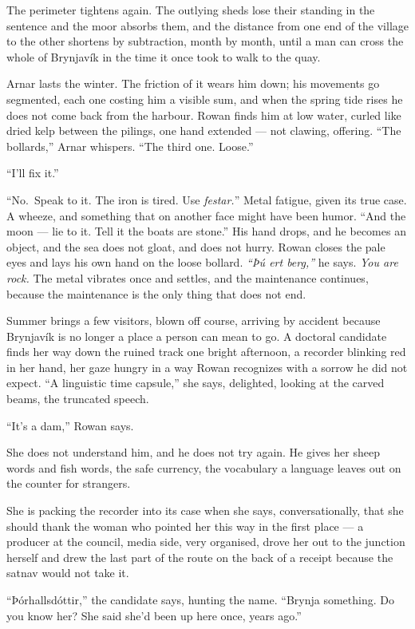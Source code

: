 \documentclass[11pt,oneside]{book}
\begin{document}
The perimeter tightens again. The outlying sheds lose their standing in
the sentence and the moor absorbs them, and the distance from one end of
the village to the other shortens by subtraction, month by month, until
a man can cross the whole of Brynjavík in the time it once took to walk
to the quay.

Arnar lasts the winter. The friction of it wears him down; his movements
go segmented, each one costing him a visible sum, and when the spring
tide rises he does not come back from the harbour. Rowan finds him at
low water, curled like dried kelp between the pilings, one hand extended
--- not clawing, offering. ``The bollards,'' Arnar whispers. ``The third
one. Loose.''

``I'll fix it.''

``No.~Speak to it. The iron is tired. Use \emph{festar.}'' Metal
fatigue, given its true case. A wheeze, and something that on another
face might have been humor. ``And the moon --- lie to it. Tell it the
boats are stone.'' His hand drops, and he becomes an object, and the sea
does not gloat, and does not hurry. Rowan closes the pale eyes and lays
his own hand on the loose bollard. \emph{``Þú ert berg,''} he says.
\emph{You are rock.} The metal vibrates once and settles, and the
maintenance continues, because the maintenance is the only thing that
does not end.

Summer brings a few visitors, blown off course, arriving by accident
because Brynjavík is no longer a place a person can mean to go. A
doctoral candidate finds her way down the ruined track one bright
afternoon, a recorder blinking red in her hand, her gaze hungry in a way
Rowan recognizes with a sorrow he did not expect. ``A linguistic time
capsule,'' she says, delighted, looking at the carved beams, the
truncated speech.

``It's a dam,'' Rowan says.

She does not understand him, and he does not try again. He gives her
sheep words and fish words, the safe currency, the vocabulary a language
leaves out on the counter for strangers.

She is packing the recorder into its case when she says, conversationally,
that she should thank the woman who pointed her this way in the first
place --- a producer at the council, media side, very organised, drove
her out to the junction herself and drew the last part of the route on
the back of a receipt because the satnav would not take it.

``Þórhallsdóttir,'' the candidate says, hunting the name. ``Brynja
something. Do you know her? She said she'd been up here once, years
ago.''
\end{document}
